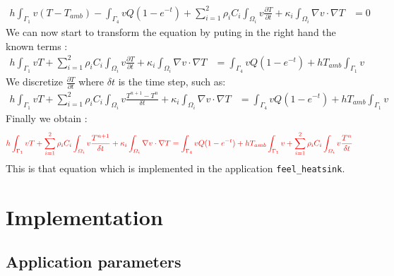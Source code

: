\begin{equation}
   \begin{split}
 \displaystyle{ h \int_{\Gamma_1}{v(T-T_{amb})} - \int_{\Gamma_4} {vQ(1-e^{-t})}  + \sum_{i=1}^{2} \rho_i C_i \int_{\varOmega_i} v\frac{ \partial T}{\partial t} + \kappa_i \int_{\varOmega_i} {\nabla v \cdot \nabla T} } & =   0 
  \end{split}
\end{equation}
We can now start to transform the equation by puting in the right hand the known terms :
\begin{equation}
   \begin{split}
 \displaystyle{ h \int_{\Gamma_1}{v T}  + \sum_{i=1}^{2} \rho_i C_i \int_{\varOmega_i} v\frac{ \partial T}{\partial t} + \kappa_i \int_{\varOmega_i} {\nabla v \cdot \nabla T} } & =  
 \int_{\Gamma_4} {vQ(1-e^{-t})}	 +  hT_{amb}\int_{\Gamma_1}{v}
  \end{split}
\end{equation}
We discretize $\displaystyle{\frac{\partial T}{\partial t}}$ where $\delta t$ is the time step, such as:
\begin{equation}
   \begin{split}
 \displaystyle{ h \int_{\Gamma_1}{v T} + \sum_{i=1}^{2} \rho_i C_i \int_{\varOmega_i} v\frac{T^{n+1} - T^n}{\delta t} + \kappa_i \int_{\varOmega_i} {\nabla v \cdot \nabla T} } & =  
 \int_{\Gamma_4} {vQ(1-e^{-t})}	 +  hT_{amb}\int_{\Gamma_1}{v}
  \end{split}
\end{equation}
Finally we obtain :
\begin{equation}
\color{red}
   \begin{split}
 \displaystyle{ h \int_{\Gamma_1}{v T} + \sum_{i=1}^{2} \rho_i C_i \int_{\varOmega_i} v\frac{T^{n+1}}{\delta t} + \kappa_i \int_{\varOmega_i} {\nabla v \cdot \nabla T}} & =  
	\displaystyle{ \int_{\Gamma_4} {vQ(1-e^{-t})} +  hT_{amb}\int_{\Gamma_1}{v}	+  \sum_{i=1}^{2}  \rho_i C_i \int_{\varOmega_i} v \frac{T^n}{\delta t}  }
  \end{split}
\end{equation}
This is that equation which is implemented in the application \lstinline!feel_heatsink!.

\section{Implementation}
\label{heat:impl}

\subsection{Application parameters}
\label{heat:param}

